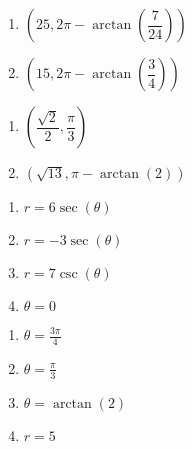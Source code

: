 \documentclass{ximera}
\begin{document}
\begin{multicols}{2}

\begin{enumerate}

\setcounter{enumi}{\value{HW}}

\item  $\left(25, 2\pi - \arctan\left(\dfrac{7}{24}\right) \right)$
\item  $\left( 15, 2\pi - \arctan\left(\dfrac{3}{4} \right) \right)$

\setcounter{HW}{\value{enumi}}

\end{enumerate}

\end{multicols}

\begin{multicols}{2}

\begin{enumerate}

\setcounter{enumi}{\value{HW}}

\item  $\left(\dfrac{\sqrt{2}}{2}, \dfrac{\pi}{3}\right)$
\item  $\left(\sqrt{13}, \pi - \arctan(2) \right)$ 

\setcounter{HW}{\value{enumi}}

\end{enumerate}

\end{multicols}

\begin{multicols}{4}

\begin{enumerate}

\setcounter{enumi}{\value{HW}}

\item $r = 6\sec(\theta)$
\item $r = -3\sec(\theta)$
\item $r = 7\csc(\theta)$
\item $\theta = 0$ 

\setcounter{HW}{\value{enumi}}

\end{enumerate}

\end{multicols}

\begin{multicols}{4}

\begin{enumerate}

\setcounter{enumi}{\value{HW}}

\item $\theta = \frac{3\pi}{4}$  
\item $\theta = \frac{\pi}{3}$  
\item $\theta = \arctan(2)$
\item $r = 5$

\setcounter{HW}{\value{enumi}}

\end{enumerate}

\end{multicols}
\end{document}
